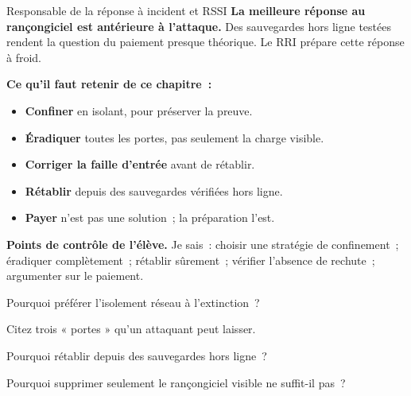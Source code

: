 \begin{boxmetier}{Responsable de la réponse à incident et RSSI}
\textbf{La meilleure réponse au rançongiciel est antérieure à l'attaque.}
Des sauvegardes hors ligne testées rendent la question du paiement presque
théorique. Le RRI prépare cette réponse à froid.
\end{boxmetier}

\separateur

\begin{boxresume}
\textbf{Ce qu'il faut retenir de ce chapitre~:}
\begin{itemize}
    \item \textbf{Confiner} en isolant, pour préserver la preuve.
    \item \textbf{Éradiquer} toutes les portes, pas seulement la charge
          visible.
    \item \textbf{Corriger la faille d'entrée} avant de rétablir.
    \item \textbf{Rétablir} depuis des sauvegardes vérifiées hors ligne.
    \item \textbf{Payer} n'est pas une solution~; la préparation l'est.
\end{itemize}
\end{boxresume}

\begin{boxinfo}
\textbf{Points de contrôle de l'élève.} Je sais~: choisir une stratégie de
confinement~; éradiquer complètement~; rétablir sûrement~; vérifier l'absence
de rechute~; argumenter sur le paiement.
\end{boxinfo}

\bigskip

\begin{boxexo}[title={\ding{45}\quad Exercice~18.1. Confiner \niveaubase}]
Pourquoi préférer l'isolement réseau à l'extinction~?
\end{boxexo}

\begin{boxexo}[title={\ding{45}\quad Exercice~18.2. Portes \niveaubase}]
Citez trois « portes » qu'un attaquant peut laisser.
\end{boxexo}

\begin{boxexo}[title={\ding{45}\quad Exercice~18.3. Sauvegardes \niveaubase}]
Pourquoi rétablir depuis des sauvegardes hors ligne~?
\end{boxexo}

\begin{boxexo}[title={\ding{45}\quad Exercice~18.4. Éradication incomplète \niveaumoyen}]
Pourquoi supprimer seulement le rançongiciel visible ne suffit-il pas~?
\end{boxexo}

